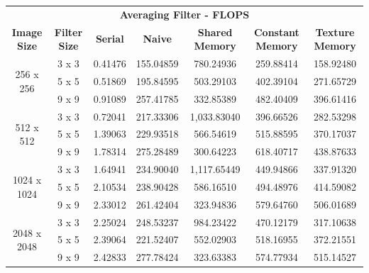 \documentclass[10pt]{article}
\begin{document}
\begin{table}[H]
\small
\begin{tabular}{ccccccc}
\multicolumn{7}{c}{\textbf{Averaging Filter - FLOPS}}                                                                                                                \\
\textbf{Image Size}          & \textbf{Filter Size} & \textbf{Serial} & \textbf{Naive} & \textbf{Shared Memory} & \textbf{Constant Memory} & \textbf{Texture Memory} \\ \hline
\multirow{3}{*}{256 x 256}   & 3 x 3                & 0.41476         & 155.04859      & 780.24936              & 259.88414                & 158.92480               \\
                             & 5 x 5                & 0.51869         & 195.84595      & 503.29103              & 402.39104                & 271.65729               \\
                             & 9 x 9                & 0.91089         & 257.41785      & 332.85389              & 482.40409                & 396.61416               \\ \hline
\multirow{3}{*}{512 x 512}   & 3 x 3                & 0.72041         & 217.33306      & 1,033.83040            & 396.66526                & 282.53298               \\
                             & 5 x 5                & 1.39063         & 229.93518      & 566.54619              & 515.88595                & 370.17037               \\
                             & 9 x 9                & 1.78314         & 275.28489      & 300.64223              & 618.40717                & 438.87633               \\ \hline
\multirow{3}{*}{1024 x 1024} & 3 x 3                & 1.64941         & 234.90040      & 1,117.65449            & 449.94866                & 337.91320               \\
                             & 5 x 5                & 2.10534         & 238.90428      & 586.16510              & 494.48976                & 414.59082               \\
                             & 9 x 9                & 2.33012         & 261.42404      & 323.94836              & 579.64760                & 506.01689               \\ \hline
\multirow{3}{*}{2048 x 2048} & 3 x 3                & 2.25024         & 248.53237      & 984.23422              & 470.12179                & 317.10638               \\
                             & 5 x 5                & 2.39064         & 221.52407      & 552.02903              & 518.16955                & 372.21551               \\
                             & 9 x 9                & 2.42833         & 277.78424      & 323.63383              & 574.77934                & 515.14527              
\end{tabular}
\end{table}
\end{document}
